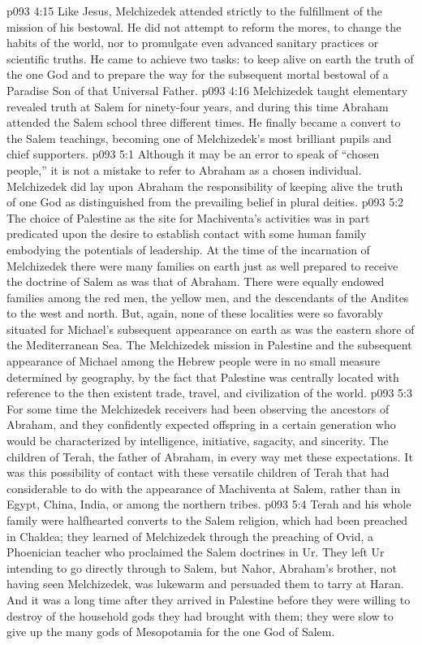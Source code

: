 \vs p093 4:15 Like Jesus, Melchizedek attended strictly to the fulfillment of the mission of his bestowal. He did not attempt to reform the mores, to change the habits of the world, nor to promulgate even advanced sanitary practices or scientific truths. He came to achieve two tasks: to keep alive on earth the truth of the one God and to prepare the way for the subsequent mortal bestowal of a Paradise Son of that Universal Father.
\vs p093 4:16 \pc Melchizedek taught elementary revealed truth at Salem for ninety\hyp{}four years, and during this time Abraham attended the Salem school three different times. He finally became a convert to the Salem teachings, becoming one of Melchizedek’s most brilliant pupils and chief supporters.
\vs p093 5:1 Although it may be an error to speak of “chosen people,” it is not a mistake to refer to Abraham as a chosen individual. Melchizedek did lay upon Abraham the responsibility of keeping alive the truth of one God as distinguished from the prevailing belief in plural deities.
\vs p093 5:2 The choice of Palestine as the site for Machiventa’s activities was in part predicated upon the desire to establish contact with some human family embodying the potentials of leadership. At the time of the incarnation of Melchizedek there were many families on earth just as well prepared to receive the doctrine of Salem as was that of Abraham. There were equally endowed families among the red men, the yellow men, and the descendants of the Andites to the west and north. But, again, none of these localities were so favorably situated for Michael’s subsequent appearance on earth as was the eastern shore of the Mediterranean Sea. The Melchizedek mission in Palestine and the subsequent appearance of Michael among the Hebrew people were in no small measure determined by geography, by the fact that Palestine was centrally located with reference to the then existent trade, travel, and civilization of the world.
\vs p093 5:3 For some time the Melchizedek receivers had been observing the ancestors of Abraham, and they confidently expected offspring in a certain generation who would be characterized by intelligence, initiative, sagacity, and sincerity. The children of Terah, the father of Abraham, in every way met these expectations. It was this possibility of contact with these versatile children of Terah that had considerable to do with the appearance of Machiventa at Salem, rather than in Egypt, China, India, or among the northern tribes.
\vs p093 5:4 Terah and his whole family were halfhearted converts to the Salem religion, which had been preached in Chaldea; they learned of Melchizedek through the preaching of Ovid, a Phoenician teacher who proclaimed the Salem doctrines in Ur. They left Ur intending to go directly through to Salem, but Nahor, Abraham’s brother, not having seen Melchizedek, was lukewarm and persuaded them to tarry at Haran. And it was a long time after they arrived in Palestine before they were willing to destroy  of the household gods they had brought with them; they were slow to give up the many gods of Mesopotamia for the one God of Salem.
